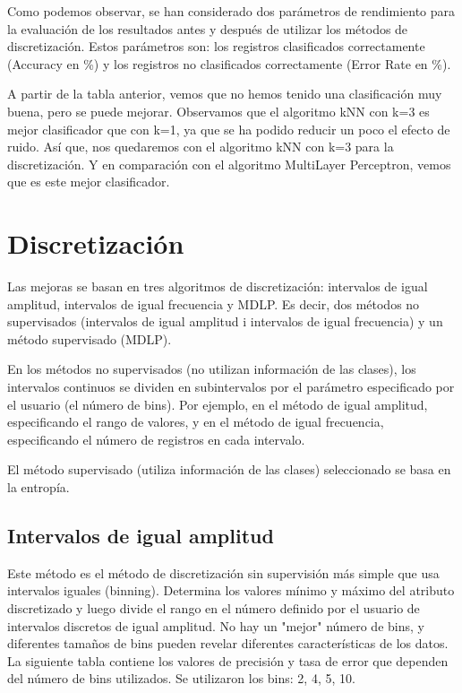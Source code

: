 \documentclass{article}
\begin{document}
Como podemos observar, se han considerado dos parámetros de rendimiento para la evaluación de los resultados antes y después de utilizar los métodos de discretización. Estos parámetros son: los registros clasificados correctamente (Accuracy en \%) y los registros no clasificados correctamente (Error Rate en \%). 

A partir de la tabla anterior, vemos que no hemos tenido una clasificación muy buena, pero se puede mejorar. Observamos que el algoritmo kNN con k=3 es mejor clasificador que con k=1, ya que se ha podido reducir un poco el efecto de ruido. Así que, nos quedaremos con el algoritmo kNN con k=3 para la discretización. Y en comparación con el algoritmo MultiLayer Perceptron, vemos que es este mejor clasificador.

\section*{Discretización}

Las mejoras se basan en tres algoritmos de discretización: intervalos de igual amplitud, intervalos de igual frecuencia y MDLP. Es decir, dos métodos no supervisados (intervalos de igual amplitud i intervalos de igual frecuencia) y un método supervisado (MDLP).

En los métodos no supervisados (no utilizan información de las clases), los intervalos continuos se dividen en subintervalos por el parámetro especificado por el usuario (el número de bins). Por ejemplo, en el método de igual amplitud, especificando el rango de valores, y en el método de igual frecuencia, especificando el número de registros en cada intervalo.

El método supervisado (utiliza información de las clases) seleccionado se basa en la entropía.

\subsection*{Intervalos de igual amplitud}

Este método es el método de discretización sin supervisión más simple que usa intervalos iguales (binning). Determina los valores mínimo y máximo del atributo discretizado y luego divide el rango en el número definido por el usuario de intervalos discretos de igual amplitud. No hay un "mejor" número de bins, y diferentes tamaños de bins pueden revelar diferentes características de los datos. La siguiente tabla contiene los valores de precisión y tasa de error que dependen del número de bins utilizados. Se utilizaron los bins: 2, 4, 5, 10.
\end{document}

